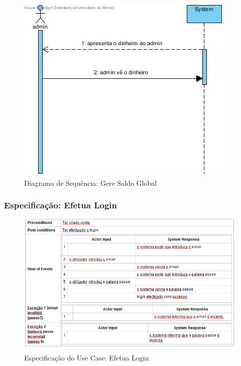 \begin{figure}[htb!]
	\centering
	\includegraphics[scale=0.5]{imagens/diagramaSeq/GereSaldoGlobal}  
	\caption{Diagrama de Sequência: Gere Saldo Global}  
\end{figure}


\subsubsection{Especificação: Efetua Login }

\begin{figure}[htb!]
	\centering
	\includegraphics[scale=0.6]{imagens/Especificacoes/efetualogin}  
	\caption{Especificação do Use Case: Efetua Login  }  
\end{figure}


